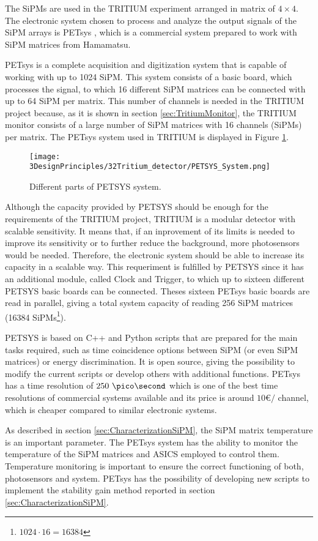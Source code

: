 The SiPMs are used in the TRITIUM experiment arranged in matrix of $4\times 4$. The electronic system chosen to process and analyze the output signals of the SiPM arrays is PETsys \cite{PETSYS}, which is a commercial system prepared to work with SiPM matrices from Hamamatsu.

PETsys is a complete acquisition and digitization system that is capable of working with up to 1024 SiPM. This system consists of a basic board, which processes the signal, to which 16 different SiPM matrices can be connected with up to 64 SiPM per matrix. This number of channels is needed in the TRITIUM project because, as it is shown in section \ref{sec:TritiumMonitor}, the TRITIUM monitor consists of a large number of SiPM matrices with 16 channels (SiPMs) per matrix. The PETsys system used in TRITIUM is displayed in Figure \ref{fig:PETSYS}.

\begin{figure}[h]
\centering
\texttt{[image: 3DesignPrinciples/32Tritium\_detector/PETSYS\_System.png]}
\caption{Different parts of PETSYS system.\label{fig:PETSYS}~\cite{PETSYS}}
\end{figure}

Although the capacity provided by PETSYS should be enough for the requirements of the TRITIUM project, TRITIUM is a modular detector with scalable sensitivity. It means that, if an inprovement of its limits is needed to improve its sensitivity or to further reduce the background, more photosensors would be needed. Therefore, the electronic system should be able to increase its capacity in a scalable way. This requeriment is fulfilled by PETSYS since it has an additional module, called Clock and Trigger, to which up to sixteen different PETSYS basic boards can be connected. Theses sixteen PETsys basic boards are read in parallel, giving a total system capacity of reading 256 SiPM matrices (16384 SiPMs\footnote{$1024\cdot{}16 = 16384$}). 

PETSYS is based on C++ and Python scripts that are prepared for the main tasks required, such as time coincidence options between SiPM (or even SiPM matrices) or energy discrimination. It is open source, giving the possibility to modify the current scripts or develop others with additional functions. PETsys has a time resolution of $250~\pico\second$ which is one of the best time resolutions of commercial systems available and its price is around $10$\euro$/$ channel, which is cheaper compared to similar electronic systems.

As described in section \ref{sec:CharacterizationSiPM}, the SiPM matrix temperature is an important parameter. The PETsys system has the ability to monitor the temperature of the SiPM matrices and ASICS employed to control them. Temperature monitoring is important to ensure the correct functioning of both, photosensors and system. PETsys has the possibility of developing new scripts to implement the stability gain method reported in section \ref{sec:CharacterizationSiPM}.


